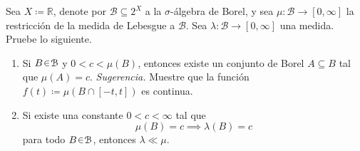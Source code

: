 \setcounter{neje}{29}
\begin{nejer}
Sea $X \coloneq \mathbb{R}$, denote por $\mathcal{B} \subseteq 2^X$ a la $\sigma$-álgebra de Borel, y sea $\mu \colon \mathcal{B} \to [0, \infty]$ la restricción de la medida de Lebesgue a $\mathcal{B}$. Sea $\lambda \colon \mathcal{B} \to [0, \infty]$ una medida. Pruebe lo siguiente.
\begin{enumerate}[label = (\roman*), leftmargin=1.8em]
    \item Si $B \en \mathcal{B}$ y $0 < c < \mu(B)$, entonces existe un conjunto de Borel $A \subseteq B$ tal que $\mu(A) = c$. \emph{Sugerencia.} Muestre que la función $f(t) \coloneq \mu(B \cap [-t, t])$ es continua.
    \item Si existe una constante $0 < c < \infty$ tal que
    $$
    \mu(B) = c \implies \lambda(B) = c
    $$
    para todo $B \en \mathcal{B}$, entonces $\lambda \ll \mu$.
\end{enumerate}
\end{nejer}
